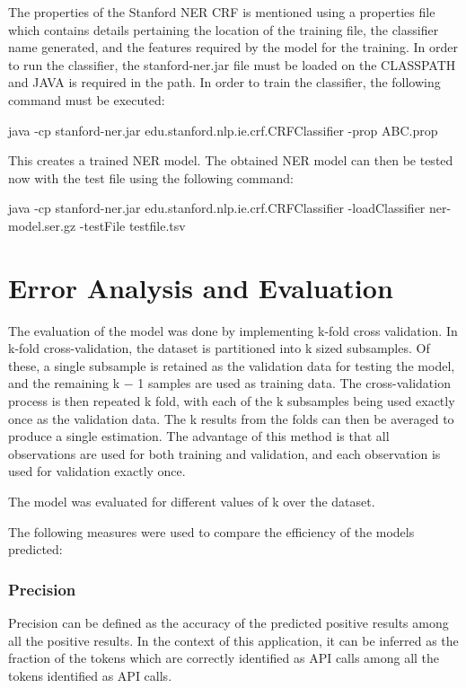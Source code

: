 \documentclass{sig-alternate-05-2015}
\begin{document}
The properties of the Stanford NER CRF is mentioned using a properties file which contains details pertaining the location of the training file, the classifier name generated, and the features required by the model for the training. In order to run the classifier, the stanford-ner.jar file must be loaded on the CLASSPATH and JAVA is required in the path. In order to train the classifier, the following command must be executed: 

\begin{description}
\item 
java -cp stanford-ner.jar edu.stanford.nlp.ie.crf.CRFClassifier -prop ABC.prop
\end{description}
This creates a trained NER model. The obtained NER model can then be tested now with the test file using the following command: 
\begin{description}
\item
java -cp stanford-ner.jar edu.stanford.nlp.ie.crf.CRFClassifier -loadClassifier ner-model.ser.gz -testFile testfile.tsv
\end{description}

\section{Error Analysis and Evaluation}
The evaluation of the model was done by implementing k-fold cross validation. In k-fold cross-validation, the dataset is partitioned into k sized subsamples. Of these, a single subsample is retained as the validation data for testing the model, and the remaining k − 1 samples are used as training data. The cross-validation process is then repeated k fold, with each of the k subsamples being used exactly once as the validation data. The k results from the folds can then be averaged to produce a single estimation. The advantage of this method is that all observations are used for both training and validation, and each observation is used for validation exactly once. 

The model was evaluated for different values of k over the dataset.

The following measures were used to compare the efficiency of the models predicted:

\subsubsection{Precision}
Precision can be defined as the accuracy of the predicted positive results among all the positive results. In the context of this application, it can be inferred as the fraction of the tokens which are correctly identified as API calls among all the tokens identified as API calls.
\end{document}
